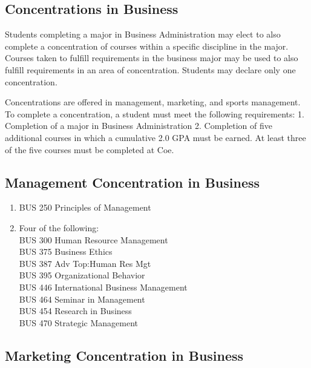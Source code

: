 \documentclass[
  letterpaper,
]{scrbook}
\providecommand{\tightlist}{%
  \setlength{\itemsep}{0pt}\setlength{\parskip}{0pt}}
\begin{document}
\subsection{Concentrations in
Business}\label{concentrations-in-business}

Students completing a major in Business Administration may elect to also
complete a concentration of courses within a specific discipline in the
major. Courses taken to fulfill requirements in the business major may
be used to also fulfill requirements in an area of concentration.
Students may declare only one concentration.

Concentrations are offered in management, marketing, and sports
management. To complete a concentration, a student must meet the
following requirements: 1. Completion of a major in Business
Administration 2. Completion of five additional courses in which a
cumulative 2.0 GPA must be earned. At least three of the five courses
must be completed at Coe.

\subsection{Management Concentration in
Business}\label{management-concentration-in-business}

\begin{enumerate}
\def\labelenumi{\arabic{enumi}.}
\tightlist
\item
  BUS 250 Principles of Management
\item
  Four of the following:\\
  BUS 300 Human Resource Management\\
  BUS 375 Business Ethics\\
  BUS 387 Adv Top:Human Res Mgt\\
  BUS 395 Organizational Behavior\\
  BUS 446 International Business Management\\
  BUS 464 Seminar in Management\\
  BUS 454 Research in Business\\
  BUS 470 Strategic Management
\end{enumerate}

\subsection{Marketing Concentration in
Business}\label{marketing-concentration-in-business}
\end{document}
